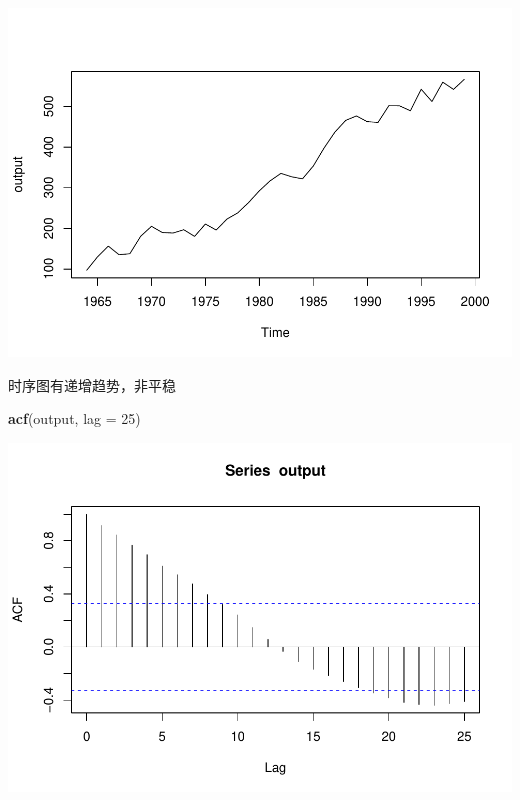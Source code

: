 \documentclass[]{article}
\newenvironment{Shaded}{\begin{snugshade}}{\end{snugshade}}
\newcommand{\DataTypeTok}[1]{\textcolor[rgb]{0.13,0.29,0.53}{#1}}
\newcommand{\DecValTok}[1]{\textcolor[rgb]{0.00,0.00,0.81}{#1}}
\newcommand{\KeywordTok}[1]{\textcolor[rgb]{0.13,0.29,0.53}{\textbf{#1}}}
\newcommand{\NormalTok}[1]{#1}
\newcommand{\OperatorTok}[1]{\textcolor[rgb]{0.81,0.36,0.00}{\textbf{#1}}}
\newcommand{\StringTok}[1]{\textcolor[rgb]{0.31,0.60,0.02}{#1}}
\begin{document}
\begin{Shaded}
\end{Shaded}

\includegraphics{timeseries_files/figure-latex/ex2.1-1.pdf}

时序图有递增趋势，非平稳

\begin{Shaded}
\begin{Highlighting}[]
\KeywordTok{acf}\NormalTok{(output, }\DataTypeTok{lag =} \DecValTok{25}\NormalTok{)}
\end{Highlighting}
\end{Shaded}

\includegraphics{timeseries_files/figure-latex/2.1acf-1.pdf}
\end{document}

